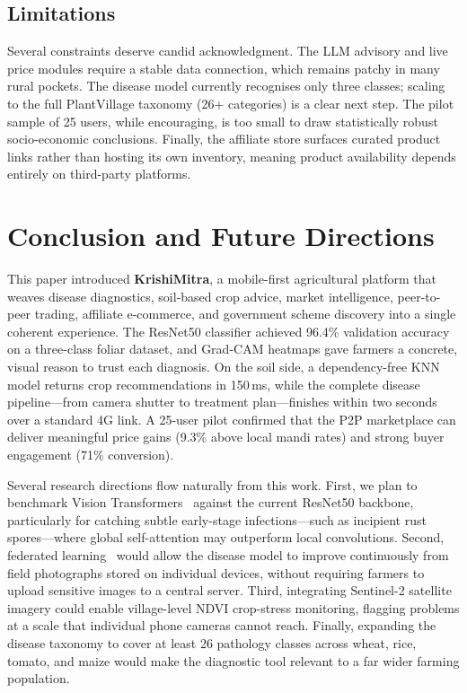 \documentclass[conference]{IEEEtran}
\begin{document}
\subsection{Limitations}
Several constraints deserve candid acknowledgment. The LLM advisory and
live price modules require a stable data connection, which remains patchy in many rural pockets. The
disease model currently recognises only three classes; scaling to the full PlantVillage taxonomy
(26+ categories) is a clear next step. The pilot sample of 25 users, while encouraging, is too small
to draw statistically robust socio-economic conclusions. Finally, the affiliate store surfaces
curated product links rather than hosting its own inventory, meaning product availability depends
entirely on third-party platforms.

\section{Conclusion and Future Directions}

This paper introduced \textbf{KrishiMitra}, a mobile-first agricultural platform that weaves disease
diagnostics, soil-based crop advice, market intelligence, peer-to-peer trading, affiliate
e-commerce, and government scheme discovery into a single coherent experience. The ResNet50
classifier achieved 96.4\% validation accuracy on a three-class foliar dataset, and Grad-CAM
heatmaps gave farmers a concrete, visual reason to trust each diagnosis. On the soil side, a
dependency-free KNN model returns crop recommendations in 150\,ms, while the complete disease
pipeline---from camera shutter to treatment plan---finishes within two seconds over a standard 4G
link. A 25-user pilot confirmed that the P2P marketplace can deliver meaningful price gains (9.3\%
above local mandi rates) and strong buyer engagement (71\% conversion).

Several research directions flow naturally from this work. First, we plan to benchmark Vision
Transformers~\cite{dosovitskiy2020} against the current ResNet50 backbone, particularly for catching
subtle early-stage infections---such as incipient rust spores---where global self-attention may
outperform local convolutions. Second, federated learning~\cite{bonawitz2019} would allow the
disease model to improve continuously from field photographs stored on individual devices, without
requiring farmers to upload sensitive images to a central server. Third, integrating Sentinel-2
satellite imagery could enable village-level NDVI crop-stress monitoring, flagging problems at a
scale that individual phone cameras cannot reach. Finally, expanding the disease taxonomy to cover
at least 26 pathology classes across wheat, rice, tomato, and maize would make the diagnostic tool
relevant to a far wider farming population.
\end{document}

